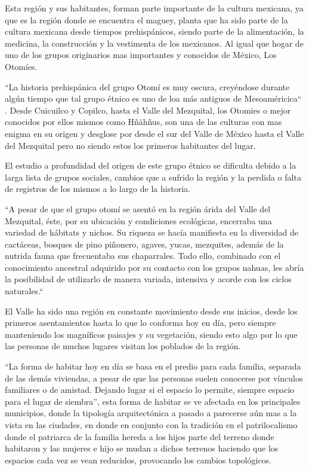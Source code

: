 Esta región y sus habitantes, forman parte importante de la cultura mexicana, ya que es la región donde se encuentra el maguey, planta que ha sido parte de la cultura mexicana desde tiempos prehispánicos, siendo parte de la alimentación, la medicina, la construcción y la vestimenta de los mexicanos. Al igual que hogar de uno de los grupos originarios mas importantes y conocidos de México, Los Otomíes.

``La historia prehispánica del grupo Otomí es muy oscura, creyéndose durante algún tiempo que tal grupo étnico es uno de loa más antiguos de Mesoaméricica`` \cite[p. 67]{GuerreroGuerrero1983}. Desde Cuicuilco y Copilco, hasta el Valle del Mezquital, los Otomies o mejor conocidos por ellos mismos como Hñähñus, son una de las culturas con mas enigma en su origen y desglose por desde el sur del Valle de México hasta el Valle del Mezquital pero no siendo estos los primeros habitantes del lugar.

El estudio a profundidad del origen de este grupo étnico se dificulta debido a la larga lista de grupos sociales, cambios que a sufrido la región y la perdida o falta de registros de los mismos a lo largo de la historia.

``A pesar de que el grupo otomí se asentó en la región árida del Valle del Mezquital, éste, por su ubicación y condiciones ecológicas, encerraba una variedad de hábitats y nichos. Su riqueza se hacía manifiesta en la diversidad de cactáceas, bosques de pino piñonero, agaves, yucas, mezquites, además de la nutrida fauna que frecuentaba sus chaparrales. Todo ello, combinado con el conocimiento ancestral adquirido por su contacto con los grupos nahuas, les abría la posibilidad de utilizarlo de manera variada, intensiva y acorde con los ciclos naturales.`` \citep{granados2004agricultura}

El Valle ha sido una región en constante movimiento desde sus inicios, desde los primeros asentamientos hasta lo que lo conforma hoy en día, pero siempre manteniendo los magníficos paisajes y su vegetación, siendo esto algo por lo que las personas de muchos lugares visitan los poblados de la región.

``La forma de habitar hoy en día se basa en el predio para cada familia, separada de las demás viviendas, a pesar de que las personas suelen conocerse por vínculos familiares o de amistad. Dejando lugar si el espacio lo permite, siempre espacio para el lugar de siembra''\cite*{GuerreroGuerrero1983}, esta forma de habitar se ve afectada en los principales municipios, donde la tipología arquitectónica a pasado a parecerse aún mas a la vista en las ciudades, en donde en conjunto con la tradición en el patrilocalismo donde el patriarca de la familia hereda a los hijos parte del terreno donde habitaron y las mujeres e hijo se mudan a dichos terrenos haciendo que los espacios cada vez se vean reducidos, provocando los cambios topológicos.


